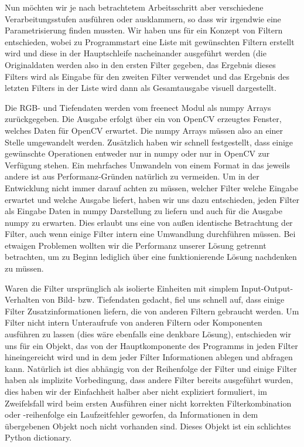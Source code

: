 \documentclass[12pt,a4paper,ngerman]{scrartcl}
\begin{document}
Nun möchten wir je nach betrachtetem Arbeitsschritt aber verschiedene
Verarbeitungsstufen ausführen oder ausklammern, so dass wir irgendwie eine
Parametrisierung finden mussten. Wir haben uns für ein Konzept von Filtern
entschieden, wobei zu Programmstart eine Liste mit gewünschten Filtern erstellt
wird und diese in der Hauptschleife nacheinander ausgeführt werden (die Originaldaten
werden also in den ersten Filter gegeben, das Ergebnis dieses Filters wird als
Eingabe für den zweiten Filter verwendet und das Ergebnis des letzten Filters
in der Liste wird dann als Gesamtausgabe visuell dargestellt.

Die RGB- und Tiefendaten werden vom freenect Modul als numpy Arrays zurückgegeben.
Die Ausgabe erfolgt über ein von OpenCV erzeugtes Fenster, welches Daten für
OpenCV erwartet. Die numpy Arrays müssen also an einer Stelle umgewandelt werden.
Zusätzlich haben wir schnell festgestellt, dass einige gewünschte Operationen
entweder nur in numpy oder nur in OpenCV zur Verfügung stehen. Ein mehrfaches
Umwandeln von einem Format in das jeweils andere ist aus Performanz-Gründen
natürlich zu vermeiden. Um in der Entwicklung nicht immer darauf achten zu müssen,
welcher Filter welche Eingabe erwartet und welche Ausgabe liefert, haben wir uns dazu
entschieden, jeden Filter als Eingabe Daten in numpy Darstellung zu liefern und auch
für die Ausgabe numpy zu erwarten. Dies erlaubt uns eine von außen identische
Betrachtung der Filter, auch wenn einige Filter intern eine Umwandlung durchführen
müssen. Bei etwaigen Problemen wollten wir die Performanz unserer Lösung getrennt
betrachten, um zu Beginn lediglich über eine funktionierende Lösung nachdenken
zu müssen.

Waren die Filter ursprünglich als isolierte Einheiten mit simplem
Input-Output-Verhalten von Bild- bzw. Tiefendaten gedacht, fiel uns schnell auf,
dass einige Filter Zusatzinformationen liefern, die von anderen Filtern gebraucht
werden. Um Filter nicht intern Unteraufrufe von anderen Filtern oder Komponenten
ausführen zu lassen (dies wäre ebenfalls eine denkbare Lösung), entschieden wir uns
für ein Objekt, das von der Hauptkomponente des Programms in jeden Filter
hineingereicht wird und in dem jeder Filter Informationen ablegen und abfragen kann.
Natürlich ist dies abhängig von der Reihenfolge der Filter und einige Filter haben
als implizite Vorbedingung, dass andere Filter bereits ausgeführt wurden, dies haben
wir der Einfachheit halber aber nicht expliziert formuliert, im Zweifelsfall wird
beim ersten Ausführen einer nicht korrekten Filterkombination oder -reihenfolge ein
Laufzeitfehler geworfen, da Informationen in dem übergebenen Objekt noch nicht
vorhanden sind. Dieses Objekt ist ein schlichtes Python dictionary.
\end{document}
